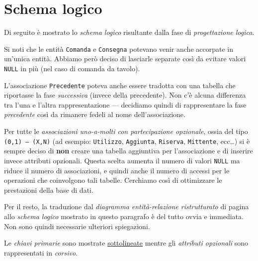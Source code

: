 \section{Schema logico}\label{sec:scheme}
Di seguito è mostrato lo {\it schema logico} risultante dalla fase di {\it progettazione logica}.

\vspace{10pt}
Si noti che le entità {\tt Comanda} e {\tt Consegna} potevano venir anche accorpate in un'unica entità. Abbiamo
però deciso di lasciarle separate così da evitare valori {\tt NULL} in più (nel caso di comanda da tavolo).

L'associazione {\tt Precedente} poteva anche essere tradotta con una tabella che riportasse
la fase {\it successiva} (invece della precedente). Non c'è alcuna differenza
tra l'una e l'altra rappresentazione --- decidiamo quindi di rappresentare la fase
{\it precedente} così da rimanere fedeli al nome dell'associazione.

Per tutte le {\it associazioni uno-a-molti con partecipazione opzionale}, ossia del tipo \hbox{\tt (0,1) --- (X,N)} (ad
esempio: {\tt Utilizzo}, {\tt Aggiunta}, {\tt Riserva}, {\tt Mittente}, ecc\ldots) si è sempre
deciso di {\bf non} creare una tabella aggiuntiva per l'associazione e di inserire invece
attributi opzionali. Questa scelta aumenta il numero di valori {\tt NULL} ma riduce il numero
di associazioni, e quindi anche il numero di accessi per le operazioni che coinvolgono tali
tabelle. Cerchiamo così di ottimizzare le prestazioni della base di dati.

Per il resto, la traduzione dal {\it diagramma entità-relazione ristrutturato} di pagina \pageref{diagram.2}
allo {\it schema logico} mostrato in questo paragrafo è del tutto ovvia e immediata. Non
sono quindi necessarie ulteriori spiegazioni.

\vspace{10pt}
Le {\it chiavi primarie} sono mostrate \underline{sottolineate} mentre gli {\it attributi opzionali}
sono rappresentati in \textit{corsivo}.

